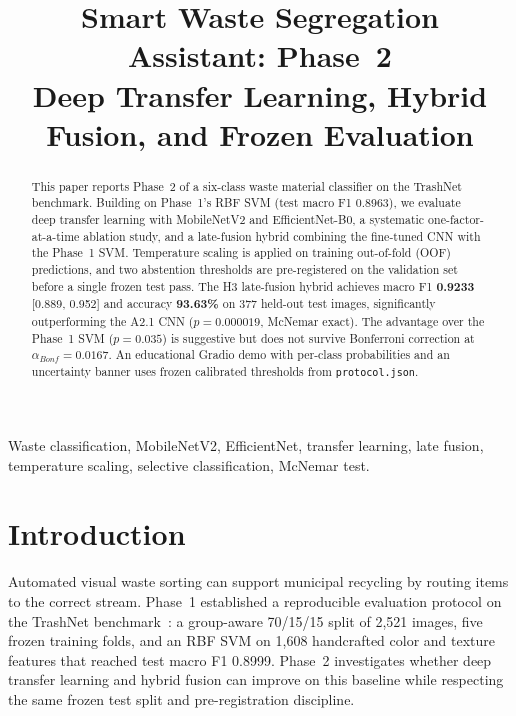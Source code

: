 \documentclass[conference]{IEEEtran}
\begin{document}
\title{Smart Waste Segregation Assistant: Phase~2\\Deep Transfer Learning, Hybrid Fusion, and Frozen Evaluation}
\author{
}
\maketitle
\pagestyle{plain}
\thispagestyle{plain}
\begin{abstract}
This paper reports Phase~2 of a six-class waste material classifier on the TrashNet benchmark. Building on Phase~1's RBF SVM (test macro F1 0.8963), we evaluate deep transfer learning with MobileNetV2 and EfficientNet-B0, a systematic one-factor-at-a-time ablation study, and a late-fusion hybrid combining the fine-tuned CNN with the Phase~1 SVM. Temperature scaling is applied on training out-of-fold (OOF) predictions, and two abstention thresholds are pre-registered on the validation set before a single frozen test pass. The H3 late-fusion hybrid achieves macro F1 \textbf{0.9233} [0.889, 0.952] and accuracy \textbf{93.63\%} on 377 held-out test images, significantly outperforming the A2.1 CNN ($p=0.000019$, McNemar exact). The advantage over the Phase~1 SVM ($p=0.035$) is suggestive but does not survive Bonferroni correction at $\alpha_{Bonf}=0.0167$. An educational Gradio demo with per-class probabilities and an uncertainty banner uses frozen calibrated thresholds from \texttt{protocol.json}.
\end{abstract}
\begin{IEEEkeywords}
Waste classification, MobileNetV2, EfficientNet, transfer learning, late fusion, temperature scaling, selective classification, McNemar test.
\end{IEEEkeywords}

\section{Introduction}
\label{sec:intro}
Automated visual waste sorting can support municipal recycling by routing items to the correct stream. Phase~1 established a reproducible evaluation protocol on the TrashNet benchmark~\cite{yang2016trashnet}: a group-aware 70/15/15 split of 2,521 images, five frozen training folds, and an RBF SVM on 1,608 handcrafted color and texture features that reached test macro F1 0.8999. Phase~2 investigates whether deep transfer learning and hybrid fusion can improve on this baseline while respecting the same frozen test split and pre-registration discipline.
\end{document}
